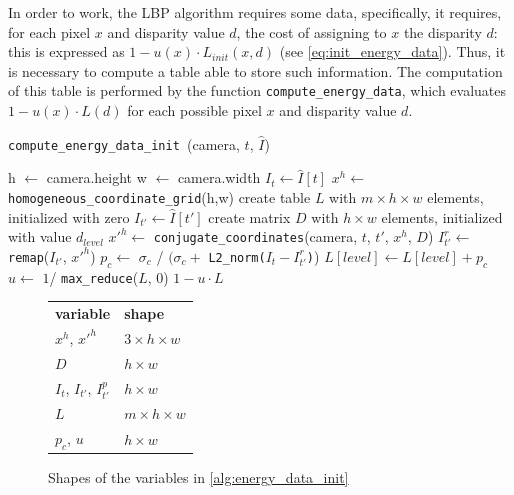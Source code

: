 \documentclass[notitlepage,english]{hgbreport}
\newcommand{\Acronym}[1]{{#1}}
\newcommand{\LBP}{\Acronym{LBP}}
\begin{document}
In order to work, the \LBP{} algorithm requires some data, specifically, it requires, for each pixel $x$ and disparity value $d$, the cost of assigning to $x$ the disparity $d$: this is expressed as $ 1- u(x)\cdot L_{init}(x,d)$ (see \cref{eq:init_energy_data}). Thus, it is necessary to compute a table able to store such information. 
The computation of this table is performed by the function \texttt{compute\_energy\_data}, which evaluates $1-u(x)\cdot L(d)$ for each possible pixel $x$ and disparity value $d$. 
\begin{algorithm}[H]
	\caption{\texttt{compute\_energy\_data\_init }(camera, $t$, $\hat I$)}
	\label{alg:energy_data_init}
\begin{algorithmic}[1]
	\State h $\leftarrow$ camera.height
	\State w $\leftarrow$ camera.width
	\State $I_t \leftarrow \hat I[ t ]$
	\State
	\State $x^h \leftarrow$ \texttt{homogeneous\_coordinate\_grid}(h,w)
	\State create table $L$ with $m\times h \times w$ elements, initialized with zero
	\State
		\State $I_{t'} \leftarrow \hat I[ t' ]$
		\State create matrix $D$ with $h \times w$ elements, initialized with value $d_{level}$
		\State $x'^h\leftarrow$ \texttt{conjugate\_coordinates}(camera, $t$,  $t'$, $x^h$, $D$)
		\State $I^r_{t'} \leftarrow$ \texttt{remap}($I_{t'}$, $x'^h$)
		\State
		\State $p_c \leftarrow$  $\sigma_c$ / $(\sigma_c +$ \texttt{L2\_norm($I_t - I^r_{t'}$)})
		\State $L[level] \leftarrow L[level] + p_c$
		\EndFor
	\EndFor
	\State
	\State $u \leftarrow$ $1$/ \texttt{max\_reduce}($L$, 0)
	\State \Return $1 - u\cdot L$
\end{algorithmic}
\end{algorithm}
\begin{figure}[!h]
	\centering
	\begin{tabular}{|l  l|}\hline\hline
		\textbf{variable}&\textbf{shape}\\
		$x^h$, $x'^h$&  $3\times h\times w$\\
		$D$ & $h\times w$\\
		$I_t$, $I_{t'}$, $I^p_{t'}$&$h\times w$\\
		$L$&$m\times h \times w$\\
		$p_c$, $u$&$h\times w$\\\hline\hline
	\end{tabular}
	\caption{Shapes of the variables in \cref{alg:energy_data_init} }
\end{figure}
\end{document}

